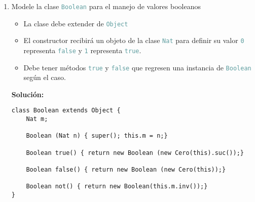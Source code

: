 \documentclass{article}
\newcommand{\tp}[1]{\textcolor{CadetBlue} {\texttt{#1}}}
\newcommand{\tb}[1]{\textcolor{RoyalPurple} {\textbf{#1}}}
\begin{document}
\begin{enumerate}
\begin{enumerate}
\begin{verbatim}
    Nat multi(Nat n) {return this;}

    /** calcular el caso base del método auxiliar 'flipPot'
    * @param Nat n número del que $this$ es exponente.
    * @return $n^0 = 1 = suc(0) = this.suc()$
    */
    Nat flipPot(Nat n) {return this.suc();}

    /** calcular el caso base del método auxiliar 'lt'
    * $0 < n \iff bool(n) = True$
    * @param Nat n número a comparar
    * @return $this < n$
    */
    Booelan lt(Nat n) {return new Boolean(n);}

    // método auxiliar para calcular 'not' en Boolean
    Nat inv() {return this.suc();}
}
        \end{verbatim}

        Donde \tp{not} está definido como

        \begin{verbatim}
class Boolean extends Object {
    ...
    Boolean not() {return new Boolean(this.m.inv());}
}
        \end{verbatim}

            \item Modele la clase \tp{Boolean} para el manejo de valores
            booleanos
            \begin{itemize}
                \item La clase debe extender de \tp{Object}

                \item El constructor recibirá un objeto de la clase \tp{Nat}
                para definir su valor \tp{0} representa \tp{false} y \tp{1}
                representa \tp{true}.

                \item Debe tener métodos \tp{true} y \tp{false} que regresen una
                instancia de \tp{Boolean} según el caso.
            \end{itemize}

            \tb{Solución:}
            \begin{verbatim}
class Boolean extends Object {
    Nat m;

    Boolean (Nat n) { super(); this.m = n;}

    Boolean true() { return new Boolean (new Cero(this).suc());}

    Boolean false() { return new Boolean (new Cero(this));}

    Boolean not() { return new Boolean(this.m.inv());}
}
            \end{verbatim}
        \end{enumerate}


\end{enumerate}
\end{document}
